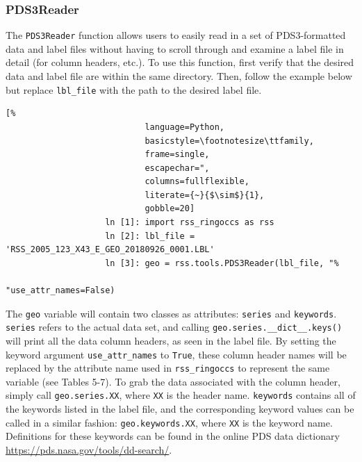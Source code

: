 \documentclass[titlepage, 12pt]{article}
\begin{document}
            \subsubsection{PDS3Reader}
                The \texttt{PDS3Reader} function allows users to easily
                read in a set of PDS3-formatted data and label files without
                having to scroll through and examine a label file in detail
                (for column headers, etc.). To use this function, first verify
                that the desired data and label file are within the same
                directory. Then, follow the example below but replace
                \texttt{lbl\_file} with the path to the desired label file.
                \begin{lstlisting}[%
                            language=Python,
                            basicstyle=\footnotesize\ttfamily,
                            frame=single,
                            escapechar=",
                            columns=fullflexible,
                            literate={~}{$\sim$}{1},
                            gobble=20]
                    ln [1]: import rss_ringoccs as rss
                    ln [2]: lbl_file = 'RSS_2005_123_X43_E_GEO_20180926_0001.LBL' 
                    ln [3]: geo = rss.tools.PDS3Reader(lbl_file, "%
                                                      "use_attr_names=False)
                \end{lstlisting}
                The \texttt{geo} variable will contain two classes as
                attributes: \texttt{series} and \texttt{keywords}.
                \texttt{series} refers to the actual data set, and
                calling \texttt{geo.series.\_\_dict\_\_.keys()} will print
                all the data column headers, as seen in the label file.
                By setting the keyword argument \texttt{use\_attr\_names}
                to \texttt{True}, these column header names will be replaced by
                the attribute name used in \texttt{rss\_ringoccs} to represent
                the same variable (see Tables 5-7). To grab the data associated
                with the column header, simply call \texttt{geo.series.XX},
                where \texttt{XX} is the header name. \texttt{keywords} contains
                all of the keywords listed in the label file, and the
                corresponding keyword values can be called in a similar fashion:
                \texttt{geo.keywords.XX}, where \texttt{XX} is the keyword
                name. Definitions for these keywords can be found in the online
                PDS data dictionary \url{https://pds.nasa.gov/tools/dd-search/}.
                
\end{document}
